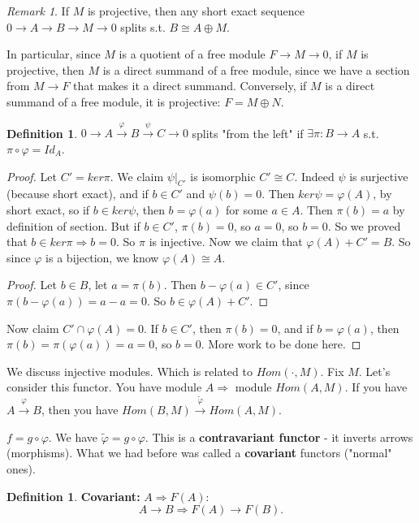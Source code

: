 \documentclass[12pt]{amsbook}
\theoremstyle{plain}
\numberwithin{section}{chapter}
\numberwithin{equation}{chapter}
\theoremstyle{definition}
\newtheorem{Def}[theorem]{Definition}
\theoremstyle{remark}
\newtheorem{rem}[theorem]{Remark}
\renewcommand{\phi}{\varphi}
\begin{document}
\begin{rem}
If $M$ is projective, then any short exact sequence $0 \to A \to B \to M \to 0$ splits s.t. $B \cong A \oplus M$. 
\end{rem}

In particular, since $M$ is a quotient of a free module $F \to M \to 0$, if $M$ is projective, then $M$ is a direct summand of a free module, since we have a section from $M \to F$ that makes it a direct summand. Conversely, if $M$ is a direct summand of a free module, it is projective: $F = M \oplus N$. 

\begin{Def}
$0 \to A \overset{\phi}{\to} B \overset{\psi}{\to } C \to 0$ splits "from the left" if $\exists \pi:B \to A$ s.t. $\pi\circ \phi = Id_A$. 
\end{Def}
\begin{proof}
 Let $C' = ker\pi$. We claim $\psi|_{C'}$ is isomorphic $C' \cong C$. Indeed $\psi$ is surjective (because short exact), and if $b \in C'$ and $\psi(b) = 0$. Then $ker\psi = \phi(A)$, by short exact, so if $b \in ker\psi$, then $b = \phi(a)$ for some $a \in A$. Then $\pi(b) = a$ by definition of section. But if $b \in C'$, $\pi(b) = 0$, so $a = 0$, so $b = 0$. So we proved that $b \in ker\pi \Rightarrow b = 0$. So $\pi$ is injective. Now we claim that $\phi(A) + C' = B$. So since $\phi$ is a bijection, we know $\phi(A) \cong A$. 
 \begin{proof}
 Let $b \in B$, let $a = \pi(b)$. Then $b - \phi(a) \in C'$, since $\pi(b - \phi(a)) = a - a = 0$. So $b \in \phi(A) + C'$. 
 \end{proof}
 Now claim $C' \cap  \phi(A) = 0$. If $b \in C'$, then $\pi(b) = 0$, and if $b = \phi(a)$, then $\pi(b) = \pi(\phi(a)) = a = 0$, so $b = 0$. More work to be done here. 
\end{proof}


We discuss injective modules. Which is related to $Hom(\cdot,M)$. Fix $M$. Let's consider this functor. You have module $A \Rightarrow$ module $ Hom(A,M)$. If you have $A \overset{\phi}{\to} B$, then you have $Hom(B,M) \overset{\tilde{\phi}}{\to} Hom(A,M)$. 
\begin{center}
$f = g \circ \phi$. We have $\tilde{\phi} = g \circ \phi$. This is a \textbf{contravariant functor} - it inverts arrows (morphisms). What we had before was called a \textbf{covariant} functors ("normal" ones). 
\end{center}
\begin{Def}
\textbf{Covariant: } $A \Rightarrow F(A)$:
$$
A \to B \Rightarrow F(A) \to F(B).
$$
\end{Def}
\end{document}
